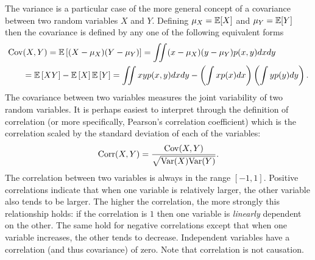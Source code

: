 The variance is a particular case of the more general concept of  a covariance between
two random variables $X$ and $Y$.  Defining $\mu_X=\mathbb{E} [X]$ and $\mu_Y=\mathbb{E} [Y]$
then the covariance is defined by any one of the following equivalent forms
\begin{align}
\operatorname{Cov}& (X,Y) = \mathbb{E} \left[(X-\mu_X)(Y-\mu_Y)\right] = \iint (x-\mu_X)(y-\mu_Y) p(x,y) dxdy \nonumber \\
&= \mathbb{E} \left[XY\right]-\mathbb{E} \left[X\right]\mathbb{E} \left[Y\right] = \iint xyp(x,y) dxdy - \left(\int xp(x) dx\right)
\left(\int yp(y) dy\right).
\end{align}
The covariance between two variables measures the joint variability of two random
variables.  It is perhaps easiest to interpret through the definition of correlation
(or more specifically, Pearson's correlation coefficient) which is the correlation
scaled by the standard deviation of each of the variables:
\begin{align}
\operatorname{Corr} (X,Y) = \frac{\operatorname{Cov} (X,Y)}{\sqrt{\mathrm{Var}(X) \mathrm{Var}(Y)}}.
\end{align}
The correlation between two variables is always in the range $[-1,1]$.  Positive
correlations indicate that when one variable is relatively larger, the other variable
also tends to be larger.  The higher the correlation, the more strongly this relationship
holds: if the correlation is $1$ then one variable is \emph{linearly} dependent on the other.  The
same hold for negative correlations except that when one variable increases, the other tends
to decrease.  Independent variables have a correlation (and thus covariance) of zero.
Note that correlation is not causation.